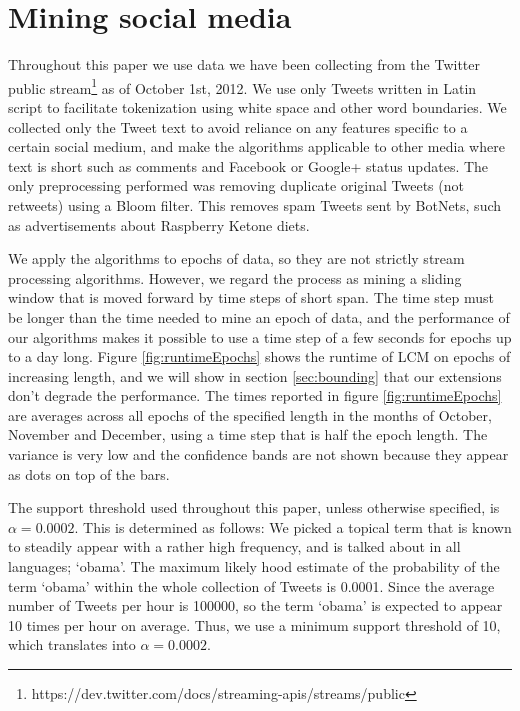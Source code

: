 \documentclass{sig-alternate}
\begin{document}

\section{Mining social media}
\label{sec:socmine}

Throughout this paper we use data we have been collecting from the Twitter public stream\footnote{https://dev.twitter.com/docs/streaming-apis/streams/public} as of October 1st, 2012. 
We use only Tweets written in Latin script to facilitate tokenization using white space and other word boundaries. We collected only the Tweet text to avoid reliance on any features specific to a certain social medium, and make the algorithms applicable to other media where text is short such as comments and Facebook or Google+ status updates. The only preprocessing performed was removing duplicate original Tweets (not retweets) using a Bloom filter. This removes spam Tweets sent by BotNets, such as advertisements about Raspberry Ketone diets.

We apply the algorithms to epochs of data, so they are not strictly stream processing algorithms. However, we regard the process as mining a sliding window that is moved forward by time steps of short span. The time step must be longer than the time needed to mine an epoch of data, and the performance of our algorithms makes it possible to use a time step of a few seconds for epochs up to a day long. Figure \ref{fig:runtimeEpochs} shows the runtime of LCM on epochs of increasing length, and we will show in section \ref{sec:bounding} that our extensions don't degrade the performance. The times reported in figure \ref{fig:runtimeEpochs} are averages across all epochs of the specified length in the months of October, November and December, using a time step that is half the epoch length. The variance is very low and the confidence bands are not shown because they appear as dots on top of the bars. 

The support threshold used throughout this paper, unless otherwise specified, is $\alpha=0.0002$. This is determined as follows: We picked a topical term that is known to  steadily  appear with a rather high frequency, and is talked about in all languages; `obama'. The maximum likely hood estimate of the probability of the term `obama' within the whole collection of Tweets is 0.0001. Since the average number of Tweets per hour is 100000, so the term `obama' is expected to appear 10 times per hour on average. Thus, we use a minimum support threshold of 10, which translates into $\alpha = 0.0002$.
\end{document}
